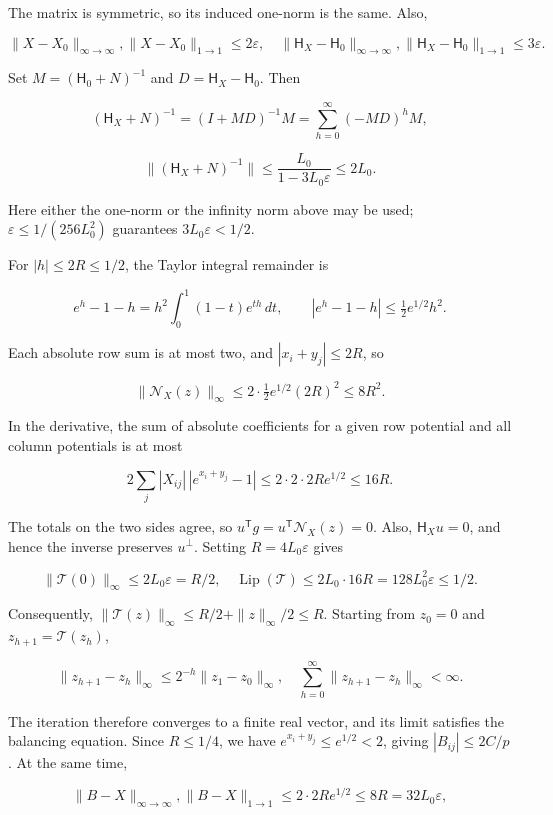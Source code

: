 \documentclass[11pt,a4paper]{article}
\begin{document}
The matrix is symmetric, so its induced one-norm is the same. Also,

\[
\|X-X_0\|_{\infty\to\infty},\|X-X_0\|_{1\to1}\le2\varepsilon,
\quad\|\mathsf H_X-\mathsf H_0\|_{\infty\to\infty},
\|\mathsf H_X-\mathsf H_0\|_{1\to1}\le3\varepsilon.
\]

Set \(M=(\mathsf H_0+N)^{-1}\) and \(D=\mathsf H_X-\mathsf H_0\). Then

\[
(\mathsf H_X+N)^{-1}=(I+MD)^{-1}M
=\sum_{h=0}^{\infty}(-MD)^hM,
\]

\[
\|(\mathsf H_X+N)^{-1}\|\le\frac{L_0}{1-3L_0\varepsilon}\le2L_0.
\]

Here either the one-norm or the infinity norm above may be used; \(\varepsilon\le1/(256L_0^2)\) guarantees \(3L_0\varepsilon<1/2\).

For \(|h|\le2R\le1/2\), the Taylor integral remainder is

\[
e^h-1-h=h^2\int_0^1(1-t)e^{th}\,dt,
\qquad |e^h-1-h|\le\tfrac12e^{1/2}h^2.
\]

Each absolute row sum is at most two, and \(|x_i+y_j|\le2R\), so

\[
\|\mathcal N_X(z)\|_\infty\le2\cdot\tfrac12e^{1/2}(2R)^2\le8R^2.
\]

In the derivative, the sum of absolute coefficients for a given row potential and all column potentials is at most

\[
2\sum_j|X_{ij}|\,|e^{x_i+y_j}-1|
\le2\cdot2\cdot2Re^{1/2}\le16R.
\]

The totals on the two sides agree, so \(u^{\mathsf T}g=u^{\mathsf T}\mathcal N_X(z)=0\). Also, \(\mathsf H_Xu=0\), and hence the inverse preserves \(u^\perp\). Setting \(R=4L_0\varepsilon\) gives

\[
\|\mathcal T(0)\|_\infty\le2L_0\varepsilon=R/2,
\quad\operatorname{Lip}(\mathcal T)\le2L_0\cdot16R
=128L_0^2\varepsilon\le1/2.
\]

Consequently, \(\|\mathcal T(z)\|_\infty\le R/2+\|z\|_\infty/2\le R\). Starting from \(z_0=0\) and \(z_{h+1}=\mathcal T(z_h)\),

\[
\|z_{h+1}-z_h\|_\infty\le2^{-h}\|z_1-z_0\|_\infty,
\quad\sum_{h=0}^{\infty}\|z_{h+1}-z_h\|_\infty<\infty.
\]

The iteration therefore converges to a finite real vector, and its limit satisfies the balancing equation. Since \(R\le1/4\), we have \(e^{x_i+y_j}\le e^{1/2}<2\), giving \(|B_{ij}|\le2C/p\). At the same time,

\[
\|B-X\|_{\infty\to\infty},\|B-X\|_{1\to1}
\le2\cdot2Re^{1/2}\le8R=32L_0\varepsilon,
\]
\end{document}

